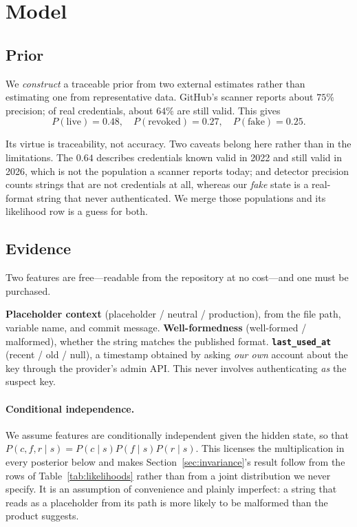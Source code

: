 \documentclass{article}
\begin{document}
\section{Model}

\subsection{Prior}

We \emph{construct} a traceable prior from two external estimates rather than
estimating one from representative data. GitHub's scanner reports about $75\%$
precision; of real credentials, about $64\%$ are still valid. This gives
\[
P(\text{live}) = 0.48,\quad
P(\text{revoked}) = 0.27,\quad
P(\text{fake}) = 0.25.
\]

Its virtue is traceability, not accuracy. Two caveats belong here rather than in
the limitations. The $0.64$ describes credentials known valid in 2022 and still
valid in 2026, which is not the population a scanner reports today; and detector
precision counts strings that are not credentials at all, whereas our
\emph{fake} state is a real-format string that never authenticated. We merge
those populations and its likelihood row is a guess for both.

\subsection{Evidence}

Two features are free---readable from the repository at no cost---and one must
be purchased.

\textbf{Placeholder context} (placeholder / neutral / production), from the file
path, variable name, and commit message. \textbf{Well-formedness} (well-formed /
malformed), whether the string matches the published format.
\textbf{\texttt{last\_used\_at}} (recent / old / null), a timestamp obtained by
asking \emph{our own} account about the key through the provider's admin API.
This never involves authenticating \emph{as} the suspect key.

\paragraph{Conditional independence.}
We assume features are conditionally independent given the hidden state, so that
$P(c,f,r \mid s) = P(c \mid s)P(f \mid s)P(r \mid s)$. This licenses the
multiplication in every posterior below and makes
Section~\ref{sec:invariance}'s result follow from the rows of
Table~\ref{tab:likelihoods} rather than from a joint distribution we never
specify. It is an assumption of convenience and plainly imperfect: a string that
reads as a placeholder from its path is more likely to be malformed than the
product suggests.
\end{document}
